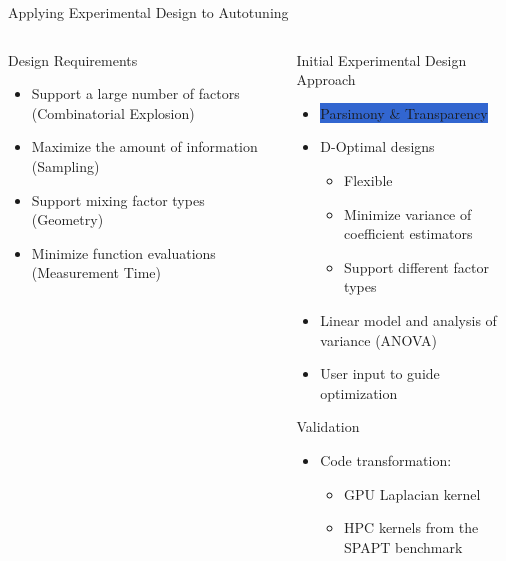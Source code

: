 \documentclass[10pt, compress, aspectratio=169, xcolor={table,usenames,dvipsnames}]{beamer}
\begin{document}
\begin{frame}[label={sec:orgd9cf538}]{Applying Experimental Design to Autotuning}
\begin{columns}
\begin{column}{0.45\columnwidth}
\begin{block}{Design Requirements}
\begin{itemize}
\item Support a large number of factors (\alert{Combinatorial Explosion})
\item Maximize the amount of information (\alert{Sampling})
\item Support mixing factor types (\alert{Geometry})
\item Minimize function evaluations (\alert{Measurement Time})
\end{itemize}
\end{block}
\end{column}

\begin{column}{0.55\columnwidth}
\begin{block}{Initial Experimental Design Approach}
\begin{itemize}
\item \colorbox{Highlight}{\alert{Parsimony} \& \alert{Transparency}}
\item D-Optimal designs
\begin{itemize}
\item Flexible
\item Minimize variance of coefficient estimators
\item Support different factor types
\end{itemize}
\item Linear model and analysis of variance (ANOVA)
\item User input to guide optimization
\end{itemize}

\begin{block}{Validation}
\begin{itemize}
\item Code transformation:
\begin{itemize}
\item GPU Laplacian kernel
\item HPC kernels from the SPAPT benchmark
\end{itemize}
\end{itemize}
\end{block}
\end{block}
\end{column}
\end{columns}
\end{frame}
\end{document}

